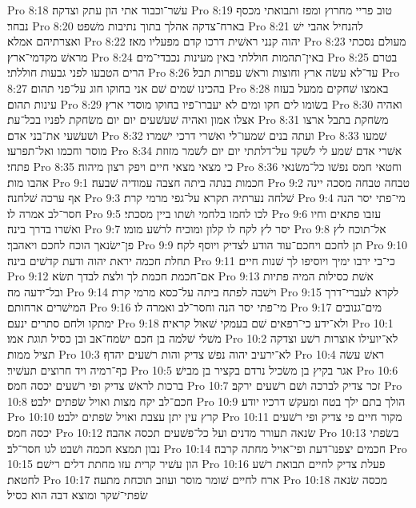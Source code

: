 Pro 8:18  עשׁר־וכבוד אתי הון עתק וצדקה׃
Pro 8:19  טוב פריי מחרוץ ומפז ותבואתי מכסף נבחר׃
Pro 8:20  בארח־צדקה אהלך בתוך נתיבות משׁפט׃
Pro 8:21  להנחיל אהבי ישׁ ואצרתיהם אמלא׃
Pro 8:22  יהוה קנני ראשׁית דרכו קדם מפעליו מאז׃
Pro 8:23  מעולם נסכתי מראשׁ מקדמי־ארץ׃
Pro 8:24  באין־תהמות חוללתי באין מעינות נכבדי־מים׃
Pro 8:25  בטרם הרים הטבעו לפני גבעות חוללתי׃
Pro 8:26  עד־לא עשׂה ארץ וחוצות וראשׁ עפרות תבל׃
Pro 8:27  בהכינו שׁמים שׁם אני בחוקו חוג על־פני תהום׃
Pro 8:28  באמצו שׁחקים ממעל בעזוז עינות תהום׃
Pro 8:29  בשׂומו לים חקו ומים לא יעברו־פיו בחוקו מוסדי ארץ׃
Pro 8:30  ואהיה אצלו אמון ואהיה שׁעשׁעים יום יום משׂחקת לפניו בכל־עת׃
Pro 8:31  משׂחקת בתבל ארצו ושׁעשׁעי את־בני אדם׃
Pro 8:32  ועתה בנים שׁמעו־לי ואשׁרי דרכי ישׁמרו׃
Pro 8:33  שׁמעו מוסר וחכמו ואל־תפרעו׃
Pro 8:34  אשׁרי אדם שׁמע לי לשׁקד על־דלתתי יום יום לשׁמר מזוזת פתחי׃
Pro 8:35  כי מצאי מצאי חיים ויפק רצון מיהוה׃
Pro 8:36  וחטאי חמס נפשׁו כל־משׂנאי אהבו מות׃
Pro 9:1  חכמות בנתה ביתה חצבה עמודיה שׁבעה׃
Pro 9:2  טבחה טבחה מסכה יינה אף ערכה שׁלחנה׃
Pro 9:3  שׁלחה נערתיה תקרא על־גפי מרמי קרת׃
Pro 9:4  מי־פתי יסר הנה חסר־לב אמרה לו׃
Pro 9:5  לכו לחמו בלחמי ושׁתו ביין מסכתי׃
Pro 9:6  עזבו פתאים וחיו ואשׁרו בדרך בינה׃
Pro 9:7  יסר לץ לקח לו קלון ומוכיח לרשׁע מומו׃
Pro 9:8  אל־תוכח לץ פן־ישׂנאך הוכח לחכם ויאהבך׃
Pro 9:9  תן לחכם ויחכם־עוד הודע לצדיק ויוסף לקח׃
Pro 9:10  תחלת חכמה יראת יהוה ודעת קדשׁים בינה׃
Pro 9:11  כי־בי ירבו ימיך ויוסיפו לך שׁנות חיים׃
Pro 9:12  אם־חכמת חכמת לך ולצת לבדך תשׂא׃
Pro 9:13  אשׁת כסילות המיה פתיות ובל־ידעה מה׃
Pro 9:14  וישׁבה לפתח ביתה על־כסא מרמי קרת׃
Pro 9:15  לקרא לעברי־דרך המישׁרים ארחותם׃
Pro 9:16  מי־פתי יסר הנה וחסר־לב ואמרה לו׃
Pro 9:17  מים־גנובים ימתקו ולחם סתרים ינעם׃
Pro 9:18  ולא־ידע כי־רפאים שׁם בעמקי שׁאול קראיה׃
Pro 10:1  משׁלי שׁלמה בן חכם ישׂמח־אב ובן כסיל תוגת אמו׃
Pro 10:2  לא־יועילו אוצרות רשׁע וצדקה תציל ממות׃
Pro 10:3  לא־ירעיב יהוה נפשׁ צדיק והות רשׁעים יהדף׃
Pro 10:4  ראשׁ עשׂה כף־רמיה ויד חרוצים תעשׁיר׃
Pro 10:5  אגר בקיץ בן משׂכיל נרדם בקציר בן מבישׁ׃
Pro 10:6  ברכות לראשׁ צדיק ופי רשׁעים יכסה חמס׃
Pro 10:7  זכר צדיק לברכה ושׁם רשׁעים ירקב׃
Pro 10:8  חכם־לב יקח מצות ואויל שׂפתים ילבט׃
Pro 10:9  הולך בתם ילך בטח ומעקשׁ דרכיו יודע׃
Pro 10:10  קרץ עין יתן עצבת ואויל שׂפתים ילבט׃
Pro 10:11  מקור חיים פי צדיק ופי רשׁעים יכסה חמס׃
Pro 10:12  שׂנאה תעורר מדנים ועל כל־פשׁעים תכסה אהבה׃
Pro 10:13  בשׂפתי נבון תמצא חכמה ושׁבט לגו חסר־לב׃
Pro 10:14  חכמים יצפנו־דעת ופי־אויל מחתה קרבה׃
Pro 10:15  הון עשׁיר קרית עזו מחתת דלים רישׁם׃
Pro 10:16  פעלת צדיק לחיים תבואת רשׁע לחטאת׃
Pro 10:17  ארח לחיים שׁומר מוסר ועוזב תוכחת מתעה׃
Pro 10:18  מכסה שׂנאה שׂפתי־שׁקר ומוצא דבה הוא כסיל׃
